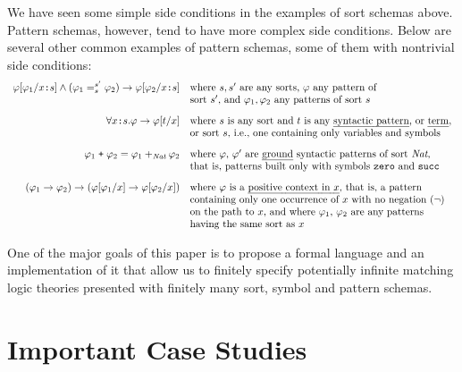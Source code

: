 \documentclass[UTF8,11pt]{article}
\theoremstyle{plain}
\theoremstyle{definition}
\theoremstyle{remark}
\newcommand{\cln}{\texttt{:}}
\newcommand{\Nat}{\textit{Nat}}
\begin{document}
We have seen some simple side conditions in the examples of sort schemas
above.
Pattern schemas, however, tend to have more complex side conditions.
Below are several other common examples of pattern schemas, some of them
with nontrivial side conditions:
$$
\begin{array}{rl}
\varphi[\varphi_1/{x\cln s}] \wedge (\varphi_1 =_s^{s'} \varphi_2) \rightarrow \varphi[\varphi_2/{x\cln s}]
&\textrm{where $s,s'$ are any sorts, $\varphi$ any pattern of} \\
& \textrm{sort $s'$, and $\varphi_1,\varphi_2$ any patterns of sort $s$}
\\[2ex]
\forall x\cln s . \varphi \rightarrow \varphi[t/x]
&\textrm{where $s$ is any sort and $t$ is any \emph{syntactic pattern}, or \emph{term}}, \\
& \textrm{or sort $s$, i.e., one containing only variables and symbols}
\\[2ex]
\varphi_1 \mathrel{\texttt{+}} \varphi_2 = \varphi_1 +_\Nat \varphi_2
& \textrm{where $\varphi$, $\varphi'$ are \emph{ground} syntactic patterns of sort $\Nat$,}
\\
&\textrm{that is, patterns built only with symbols \texttt{zero} and \texttt{succ}}
\\[2ex]
(\varphi_1 \rightarrow \varphi_2) \rightarrow
(\varphi[\varphi_1 / x] \rightarrow \varphi[\varphi_2 / x])
& \textrm{where $\varphi$ is a \emph{positive context in $x$}, that is, a pattern}
\\
& \textrm{containing only one occurrence of $x$ with no negation ($\neg$)}
\\
&\textrm{on the path to $x$, and where $\varphi_1$, $\varphi_2$ are any patterns}
\\
&\textrm{having the same sort as $x$}
\end{array}
$$

One of the major goals of this paper is to propose a formal language
and an implementation of it that allow us to finitely specify potentially
infinite matching logic theories presented with finitely many sort, symbol
and pattern schemas.

\section{Important Case Studies}
\end{document}
